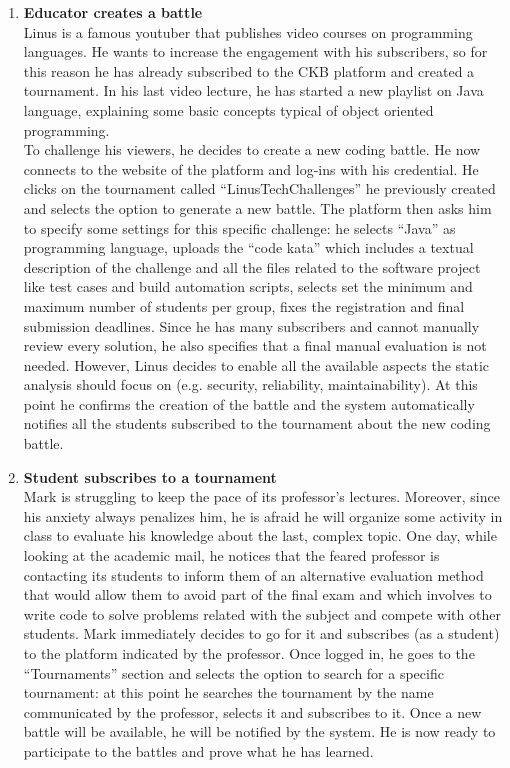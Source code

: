 \begin{enumerate}[label=\textbf{\arabic*}.]
    \item \textbf{ Educator creates a battle}\\Linus is a famous youtuber that publishes video courses on programming languages. He wants to increase the engagement with his subscribers, so for this reason he has already subscribed to the CKB platform and created a tournament. In his last video lecture, he has started a new playlist on Java language, explaining some basic concepts typical of object oriented programming.\\To challenge his viewers, he decides to create a new coding battle. He now connects to the website of the platform and log-ins with his credential. He clicks on the tournament called “LinusTechChallenges” he previously created and selects the option to generate a new battle. The platform then asks him to specify some settings for this specific challenge: he selects “Java” as programming language, uploads the “code kata” which includes a textual description of the challenge and all the files related to the software project like test cases and build automation scripts, selects set the minimum and maximum number of students per group, fixes the registration and final submission deadlines. Since he has many subscribers and cannot manually review every solution, he also specifies that a final manual evaluation is not needed. However, Linus decides to enable all the available aspects the static analysis should focus on (e.g. security, reliability, maintainability). At this point he confirms the creation of the battle and the system automatically notifies all the students subscribed to the tournament about the new coding battle.
    \item \textbf{ Student subscribes to a tournament}\\Mark is struggling to keep the pace of its professor’s lectures. Moreover, since his anxiety always penalizes him, he is afraid he will organize some activity in class to evaluate his knowledge about the last, complex topic. One day, while looking at the academic mail, he notices that the feared professor is contacting its students to inform them of an alternative evaluation method that would allow them to avoid part of the final exam and which involves to write code to solve problems related with the subject and compete with other students. Mark immediately decides to go for it and subscribes (as a student) to the platform indicated by the professor. Once logged in, he goes to the “Tournaments” section and selects the option to search for a specific tournament: at this point he searches the tournament by the name communicated by the professor, selects it and subscribes to it. Once a new battle will be available, he will be notified by the system. He is now ready to participate to the battles and prove what he has learned.

\end{enumerate}
